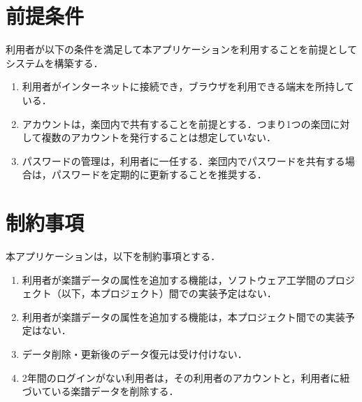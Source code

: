 \section{前提条件}
利用者が以下の条件を満足して本アプリケーションを利用することを前提としてシステムを構築する．
\begin{enumerate}
      \item 利用者がインターネットに接続でき，ブラウザを利用できる端末を所持している．
      \item アカウントは，楽団内で共有することを前提とする．つまり1つの楽団に対して複数のアカウントを発行することは想定していない．
      \item パスワードの管理は，利用者に一任する．楽団内でパスワードを共有する場合は，パスワードを定期的に更新することを推奨する．
\end{enumerate}
\section{制約事項}
本アプリケーションは，以下を制約事項とする．
\begin{enumerate}
      \item 利用者が楽譜データの属性を追加する機能は，ソフトウェア工学間のプロジェクト（以下，本プロジェクト）間での実装予定はない．
      \item 利用者が楽譜データの属性を追加する機能は，本プロジェクト間での実装予定はない．
      \item データ削除・更新後のデータ復元は受け付けない．
      \item 2年間のログインがない利用者は，その利用者のアカウントと，利用者に紐づいている楽譜データを削除する．
\end{enumerate}